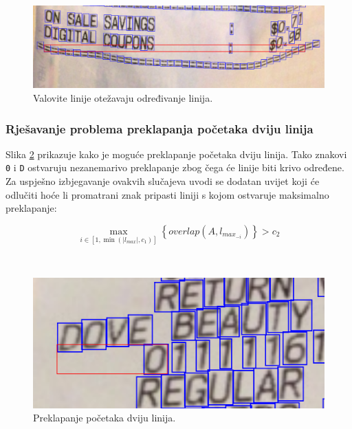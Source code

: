 \documentclass[times, utf8, zavrsni]{fer}
\begin{document}
\begin{figure}[htb]
    \centering
    \captionsetup{justification=centering,margin=2cm}
    \includegraphics[width=\textwidth]{images/aligner-01.png}
    \caption{Valovite linije otežavaju određivanje linija.}
    \label{fig:aligner-01}
\end{figure}

\pagebreak

\subsubsection{Rješavanje problema preklapanja početaka dviju linija}
Slika \ref{fig:overlap-01} prikazuje kako je moguće preklapanje početaka dviju
linija. Tako znakovi \lstinline{0} i \lstinline{D}
ostvaruju nezanemarivo preklapanje zbog čega će linije biti krivo određene.
Za uspješno izbjegavanje ovakvih slučajeva uvodi se dodatan uvijet
koji će odlučiti hoće li promatrani znak pripasti liniji s kojom ostvaruje
maksimalno preklapanje:

\begin{equation}
\label{eq:overlap-03}
\max_{i \in [1, \min(|l_{max}|, c_1)]}\left\{\textit{overlap}(A, l_{max_{-i}})
\right\} > c_2
\end{equation}

\

\begin{figure}[htb]
    \centering
    \captionsetup{justification=centering,margin=2cm}
    \includegraphics[width=\textwidth]{images/overlap-01.png}
    \caption{Preklapanje početaka dviju linija.}
    \label{fig:overlap-01}
\end{figure}
\end{document}

